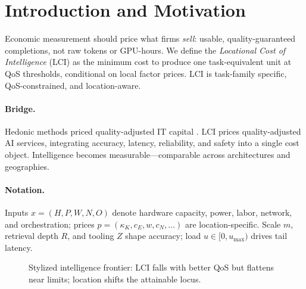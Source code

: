 \documentclass[12pt]{article}
\numberwithin{equation}{section}
\begin{document}
\newpage

\section{Introduction and Motivation}

Economic measurement should price what firms \emph{sell}: usable, quality-guaranteed completions, not raw tokens or GPU-hours.  
We define the \emph{Locational Cost of Intelligence} (LCI) as the minimum cost to produce one task-equivalent unit at QoS thresholds, conditional on local factor prices.  
LCI is task-family specific, QoS-constrained, and location-aware.

\paragraph{Bridge.}
Hedonic methods priced quality-adjusted IT capital \citep{Triplett1989,Pakes2003,Byrne2017}.  
LCI prices quality-adjusted AI services, integrating accuracy, latency, reliability, and safety into a single cost object.  
Intelligence becomes measurable—comparable across architectures and geographies.

\paragraph{Notation.}
Inputs $x=(H,P,W,N,O)$ denote hardware capacity, power, labor, network, and orchestration; prices $p=(\kappa_K,c_E,w,c_N,\dots)$ are location-specific.  
Scale $m$, retrieval depth $R$, and tooling $Z$ shape accuracy; load $u\in[0,u_{\max})$ drives tail latency.

\begin{figure}[t]
\centering
{}
\caption{Stylized intelligence frontier: LCI falls with better QoS but flattens near limits; location shifts the attainable locus.}
\label{fig:frontier}
\end{figure}
\end{document}

